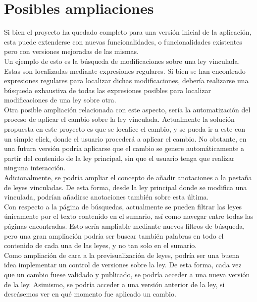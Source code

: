 \section{Posibles ampliaciones}

Si bien el proyecto ha quedado completo para una versión inicial de la aplicación, esta puede extenderse con nuevas funcionalidades, o funcionalidades existentes pero con versiones mejoradas de las mismas.
\\

Un ejemplo de esto es la búsqueda de modificaciones sobre una ley vinculada. Estas son localizadas mediante expresiones regulares. Si bien se han encontrado expresiones regulares para localizar dichas modificaciones, debería realizarse una búsqueda exhaustiva de todas las expresiones posibles para localizar modificaciones de una ley sobre otra.
\\

Otra posible ampliación relacionada con este aspecto, sería la automatización del proceso de aplicar el cambio sobre la ley vinculada. Actualmente la solución propuesta en este proyecto es que se localice el cambio, y se pueda ir a este con un simple click, donde el usuario procederá a aplicar el cambio. No obstante, en una futura versión podría aplicarse que el cambio se genere automáticamente a partir del contenido de la ley principal, sin que el usuario tenga que realizar ninguna interacción.
\\

Adicionalmente, se podría ampliar el concepto de añadir anotaciones a la pestaña de leyes vinculadas. De esta forma, desde la ley principal donde se modifica una vinculada, podrían añadirse anotaciones también sobre esta última.
\\

Con respecto a la página de búsquedas, actualmente se pueden filtrar las leyes únicamente por el texto contenido en el sumario, así como navegar entre todas las páginas encontradas. Esto sería ampliable mediante nuevos filtros de búsqueda, pero una gran ampliación podría ser buscar también palabras en todo el contenido de cada una de las leyes, y no tan solo en el sumario.
\\

Como ampliación de cara a la previsualización de leyes, podría ser una buena idea implementar un control de versiones sobre la ley. De esta forma, cada vez que un cambio fuese validado y publicado, se podría acceder a una nueva versión de la ley. Asimismo, se podría acceder a una versión anterior de la ley, si deseásemos ver en qué momento fue aplicado un cambio.
\\

